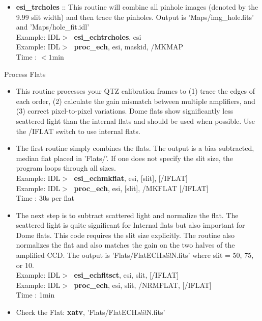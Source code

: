 \documentclass[11pt,letterpaper,dvips]{article}
\begin{document}
\begin{enumerate}
\begin{itemize}
	\item {\bf esi\_trcholes} :: This routine will combine all pinhole
	images (denoted by the 9.99 slit width) and then trace the pinholes.
	Output is 'Maps/img\_hole.fits' and 'Maps/hole\_fit.idl' \\
         \quad Example: IDL$> \;$ {\bf esi\_echtrcholes}, esi \\
         \quad Example: IDL$> \;$ {\bf proc\_ech}, esi, maskid, /MKMAP \\
         \quad Time   : $<1$min 
  \end{itemize}

{\Large  \item Process Flats }
  \begin{itemize}
	\item This routine processes your QTZ calibration frames to (1) trace
	the edges of each order, (2) calculate the gain mismatch between multiple
	amplifiers, and (3) correct pixel-to-pixel variations.  
	Dome flats show significantly less scattered light than the internal
	flats and should be used when possible.
	Use the /IFLAT switch to use internal flats.
	\item The first routine simply combines the flats.  The output is
	a bias subtracted, median flat placed in 'Flats/'.  If one does not specify
	the slit size, the program loops through all sizes. \\
         \quad Example: IDL$> \;$ {\bf esi\_echmkflat}, esi, [slit], [/IFLAT]\\
         \quad Example: IDL$> \;$ {\bf proc\_ech}, esi, [slit], /MKFLAT [/IFLAT] \\
         \quad Time   : 30s per flat 
	\item The next step is to subtract scattered light and normalize the flat.
	The scattered light is quite significant for Internal flats but also
	important for Dome flats.  This code requires the slit size 
	explicitly.  The routine also normalizes the flat and also matches the
	gain on the two halves of the amplified CCD.  The
	output is 'Flats/FlatECH{\it slit}N.fits' where slit = 50, 75, or 10.\\
         \quad Example: IDL$> \;$ {\bf esi\_echfltsct}, esi, slit, [/IFLAT]\\
         \quad Example: IDL$> \;$ {\bf proc\_ech}, esi, slit, /NRMFLAT, [/IFLAT] \\
         \quad Time   : 1min 
	\item Check the Flat: {\bf xatv}, 'Flats/FlatECH{\it slit}N.fits'
  \end{itemize}


\end{enumerate}
\end{document}
